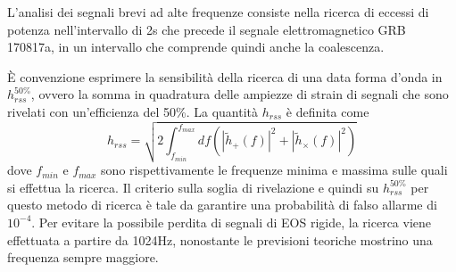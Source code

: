 L'analisi dei segnali brevi ad alte frequenze consiste nella ricerca di eccessi di potenza nell'intervallo di 2s che precede il segnale elettromagnetico GRB 170817a, in un intervallo che comprende quindi anche la coalescenza.

È convenzione esprimere la sensibilità della ricerca di una data forma d'onda in $h_{rss}^{50\%}$, ovvero la somma in quadratura delle ampiezze di strain di segnali che sono rivelati con un'efficienza del 50\%. La quantità $h_{rss}$ è definita come
\begin{equation}
h_{rss} = \sqrt{2\int_{f_{min}}^{f_{max}}df(|\tilde{h}_+(f)|^2 + |\tilde{h}_\times(f)|^2 )}
\end{equation}
dove $f_{min}$ e $f_{max}$ sono rispettivamente le frequenze minima e massima sulle quali si effettua la ricerca. 
Il criterio sulla soglia di rivelazione e quindi su $h_{rss}^{50\%}$ per questo metodo di ricerca è tale da garantire una probabilità di falso allarme di $10^{-4}$.
Per evitare la possibile perdita di segnali di EOS rigide, la ricerca viene effettuata a partire da 1024Hz, nonostante le previsioni teoriche mostrino una frequenza sempre maggiore.

